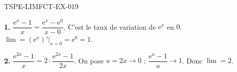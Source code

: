 \begin{corrige}{TSPE-LIMFCT-EX-019}


\textbf{1.} $\dfrac{\mathrm{e}^x - 1}{x} = \dfrac{\mathrm{e}^x - \mathrm{e}^0}{x - 0}$. C'est le taux de variation de $\mathrm{e}^x$ en $0$. $\lim = (\mathrm{e}^x)'\big|_{x=0} = \mathrm{e}^0 = \boxed{1}$.

\textbf{2.} $\dfrac{\mathrm{e}^{2x}-1}{x} = 2 \cdot \dfrac{\mathrm{e}^{2x}-1}{2x}$. On pose $u = 2x \to 0$ : $\dfrac{\mathrm{e}^u - 1}{u} \to 1$. Donc $\lim = \boxed{2}$.

\end{corrige}
